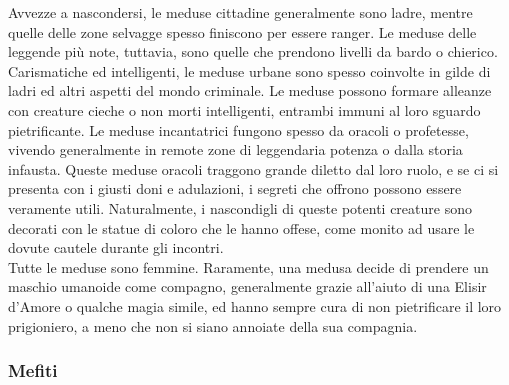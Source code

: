\begin{multicols}{2}
Avvezze a nascondersi, le meduse cittadine generalmente sono ladre, mentre quelle delle zone selvagge spesso finiscono per essere ranger. Le meduse delle leggende più note, tuttavia, sono quelle che prendono livelli da bardo o chierico. Carismatiche ed intelligenti, le meduse urbane sono spesso coinvolte in gilde di ladri ed altri aspetti del mondo criminale. Le meduse possono formare alleanze con creature cieche o non morti intelligenti, entrambi immuni al loro sguardo pietrificante. Le meduse incantatrici fungono spesso da oracoli o profetesse, vivendo generalmente in remote zone di leggendaria potenza o dalla storia infausta. Queste meduse oracoli traggono grande diletto dal loro ruolo, e se ci si presenta con i giusti doni e adulazioni, i segreti che offrono possono essere veramente utili. Naturalmente, i nascondigli di queste potenti creature sono decorati con le statue di coloro che le hanno offese, come monito ad usare le dovute cautele durante gli incontri.\\

Tutte le meduse sono femmine. Raramente, una medusa decide di prendere un maschio umanoide come compagno, generalmente grazie all'aiuto di una Elisir d’Amore o qualche magia simile, ed hanno sempre cura di non pietrificare il loro prigioniero, a meno che non si siano annoiate della sua compagnia.\\

\subsubsection{Mefiti}


\end{multicols}
